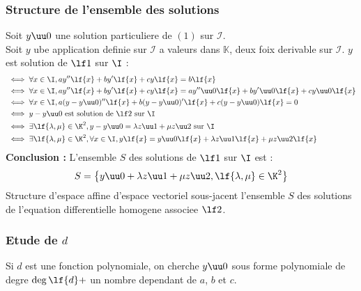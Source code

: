 \documentclass[12pt,twoside,a4paper]{article}
\begin{document}
			\subsubsection{Structure de l'ensemble des solutions}
				Soit $y\uu0$ une solution particuliere de $\left(1\right)$ sur $\mathcal{I}$.\\
				Soit $y$ ube application definie sur $\mathcal{I}$ a valeurs dans $\mathbb{K}$, deux foix derivable sur $\mathcal{I}$.
				$y$ est solution de $\lf1$ sur $\I$ :
				$$\begin{aligned}
					&\iff\forall x\in\I,ay''\lf{x}+by'\lf{x}+cy\lf{x}=b\lf{x} \\
					&\iff\forall x\in\I,ay''\lf{x}+by'\lf{x}+cy\lf{x}=ay''\uu0\lf{x}+by'\uu0\lf{x}+cy\uu0\lf{x} \\
					&\iff\forall x\in\I,a(y-y\uu0)''\lf{x}+b(y-y\uu0)'\lf{x}+c(y-y\uu0)\lf{x}=0 \\
					&\iff y-y\uu0\text{ est solution de }\lf2\text{ sur }\I \\
					&\iff\exists\lf{\lambda,\mu}\in\K^2,y-y\uu0=\lambda z\uu1+\mu z\uu2\text{ sur }\I \\
					&\iff\exists\lf{\lambda,\mu}\in\K^2,\forall x\in\I,y\lf{x}=y\uu0\lf{x}+\lambda z\uu1\lf{x}+\mu z\uu2\lf{x}
				\end{aligned}$$
				\textbf{Conclusion :} L'ensemble $S$ des solutions de $\lf1$ sur $\I$ est :
				$$S=\left\{y\uu0+\lambda z\uu1+\mu z\uu2,\lf{\lambda,\mu}\in\K^2\right\}$$
				Structure d'espace affine d'espace vectoriel sous-jacent l'ensemble $S$ des solutions de l'equation differentielle homogene associee $\lf2$.
			\subsubsection{Etude de $d$}
				\begin{liste}
					\item Si $d$ est une fonction polynomiale, on cherche $y\uu0$ sous forme polynomiale de degre $\deg\lf{d}+$ un nombre dependant de $a$, $b$ et $c$.
				\end{liste}
\end{document}

